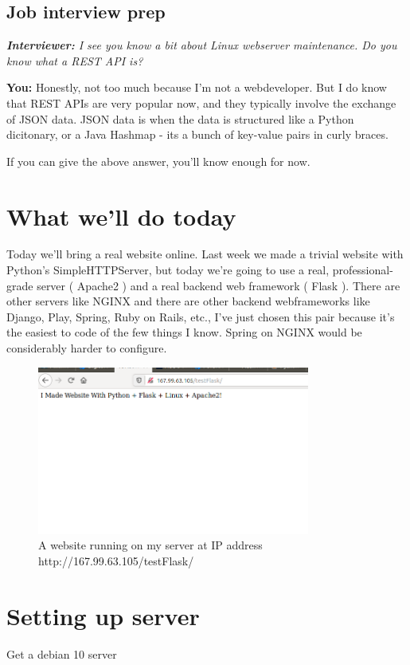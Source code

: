 \documentclass[10pt]{article}
\begin{document}
\subsection{Job interview prep}
\noindent\textit{\textbf{Interviewer:} I see you know a bit about Linux webserver maintenance. Do you know what a REST API is?}

\noindent \textbf{You: } Honestly, not too much because I'm not a webdeveloper. But I do know that REST APIs are very popular now, and they typically involve the exchange of JSON data. JSON data is when the data is structured like a Python dicitonary, or a Java Hashmap  - its a bunch of key-value pairs in curly braces.

If you can give the above answer, you'll know enough for now.

\section{What we'll do today}
Today we'll bring a real website online. Last week we made a trivial website with Python's SimpleHTTPServer, but today we're going to use a real, professional-grade server ( Apache2 ) and a real backend web framework ( Flask ). There are other servers like NGINX and there are other backend webframeworks like Django, Play, Spring, Ruby on Rails, etc., I've just chosen this pair because it's the easiest to code of the few things I know. Spring on NGINX would be considerably harder to configure.

\begin{figure}[h]
  \centering
    \includegraphics[width=0.8\textwidth]{Exercise1Success.png}
  \caption{A website running on my server at IP address http://167.99.63.105/testFlask/}
\end{figure}



\section{Setting up server}
Get a debian 10 server
\end{document}
